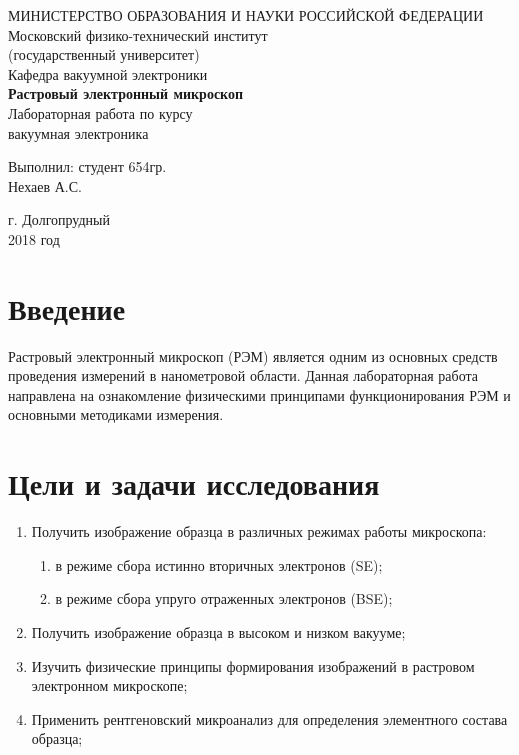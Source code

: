 \documentclass[a4paper, 12pt]{article}
\begin{document}
	\begin{titlepage}
		\begin{center}
		МИНИСТЕРСТВО ОБРАЗОВАНИЯ И НАУКИ РОССИЙСКОЙ ФЕДЕРАЦИИ\\
		\footnotesize{Московский физико-технический институт}\\
		\footnotesize{(государственный университет)}\\
		\footnotesize{Кафедра вакуумной электроники}\\
		\vfill
		{\LARGE
		\textbf{Растровый электронный микроскоп}\\
		}
		\vspace{1cm}
		Лабораторная работа по курсу\\
		вакуумная электроника
		\vfill
		\begin{flushright}
			Выполнил: студент 654гр.\\
			Нехаев А.С.
		\end{flushright}
		\vfill
		г. Долгопрудный\\
		2018 год
		\end{center}
	\end{titlepage}
	\newpage
	\tableofcontents
	\newpage
	\section{Введение}
	Растровый электронный микроскоп (РЭМ) является одним из основных средств проведения измерений в нанометровой области. Данная лабораторная работа направлена на ознакомление физическими принципами функционирования РЭМ и основными методиками измерения.
	\section{Цели и задачи исследования}
	\begin{enumerate}
		\item Получить изображение образца в различных режимах работы микроскопа:
		\begin{enumerate}
			\item в режиме сбора истинно вторичных электронов (SE);
			\item в режиме сбора упруго отраженных электронов (BSE);
		\end{enumerate}
		\item Получить изображение образца в высоком и низком вакууме;
		\item Изучить физические принципы формирования изображений в растровом электронном микроскопе;
		\item Применить рентгеновский микроанализ для определения элементного состава образца;
	\end{enumerate}
	\newpage
\end{document}
